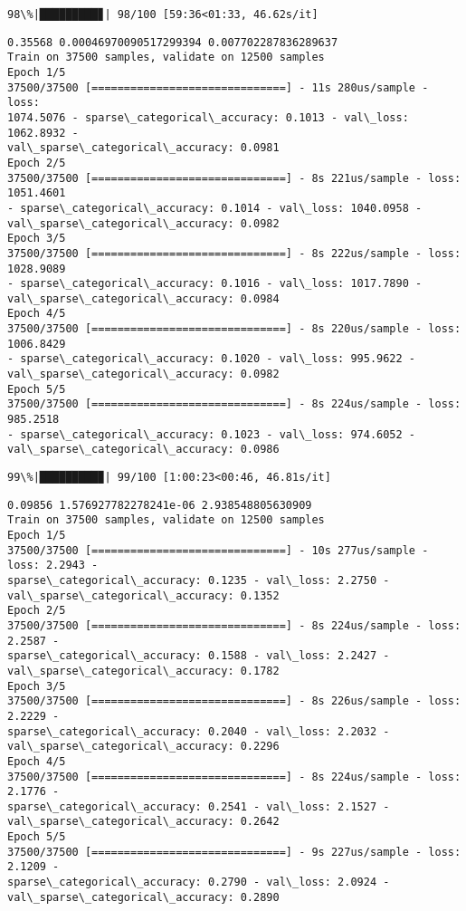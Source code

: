 \documentclass[11pt]{article}
\begin{document}
    \begin{Verbatim}[commandchars=\\\{\}]
 98\%|█████████▊| 98/100 [59:36<01:33, 46.62s/it]
    \end{Verbatim}

    \begin{Verbatim}[commandchars=\\\{\}]
0.35568 0.00046970090517299394 0.007702287836289637
Train on 37500 samples, validate on 12500 samples
Epoch 1/5
37500/37500 [==============================] - 11s 280us/sample - loss:
1074.5076 - sparse\_categorical\_accuracy: 0.1013 - val\_loss: 1062.8932 -
val\_sparse\_categorical\_accuracy: 0.0981
Epoch 2/5
37500/37500 [==============================] - 8s 221us/sample - loss: 1051.4601
- sparse\_categorical\_accuracy: 0.1014 - val\_loss: 1040.0958 -
val\_sparse\_categorical\_accuracy: 0.0982
Epoch 3/5
37500/37500 [==============================] - 8s 222us/sample - loss: 1028.9089
- sparse\_categorical\_accuracy: 0.1016 - val\_loss: 1017.7890 -
val\_sparse\_categorical\_accuracy: 0.0984
Epoch 4/5
37500/37500 [==============================] - 8s 220us/sample - loss: 1006.8429
- sparse\_categorical\_accuracy: 0.1020 - val\_loss: 995.9622 -
val\_sparse\_categorical\_accuracy: 0.0982
Epoch 5/5
37500/37500 [==============================] - 8s 224us/sample - loss: 985.2518
- sparse\_categorical\_accuracy: 0.1023 - val\_loss: 974.6052 -
val\_sparse\_categorical\_accuracy: 0.0986
    \end{Verbatim}

    \begin{Verbatim}[commandchars=\\\{\}]
 99\%|█████████▉| 99/100 [1:00:23<00:46, 46.81s/it]
    \end{Verbatim}

    \begin{Verbatim}[commandchars=\\\{\}]
0.09856 1.576927782278241e-06 2.938548805630909
Train on 37500 samples, validate on 12500 samples
Epoch 1/5
37500/37500 [==============================] - 10s 277us/sample - loss: 2.2943 -
sparse\_categorical\_accuracy: 0.1235 - val\_loss: 2.2750 -
val\_sparse\_categorical\_accuracy: 0.1352
Epoch 2/5
37500/37500 [==============================] - 8s 224us/sample - loss: 2.2587 -
sparse\_categorical\_accuracy: 0.1588 - val\_loss: 2.2427 -
val\_sparse\_categorical\_accuracy: 0.1782
Epoch 3/5
37500/37500 [==============================] - 8s 226us/sample - loss: 2.2229 -
sparse\_categorical\_accuracy: 0.2040 - val\_loss: 2.2032 -
val\_sparse\_categorical\_accuracy: 0.2296
Epoch 4/5
37500/37500 [==============================] - 8s 224us/sample - loss: 2.1776 -
sparse\_categorical\_accuracy: 0.2541 - val\_loss: 2.1527 -
val\_sparse\_categorical\_accuracy: 0.2642
Epoch 5/5
37500/37500 [==============================] - 9s 227us/sample - loss: 2.1209 -
sparse\_categorical\_accuracy: 0.2790 - val\_loss: 2.0924 -
val\_sparse\_categorical\_accuracy: 0.2890
    \end{Verbatim}
\end{document}
